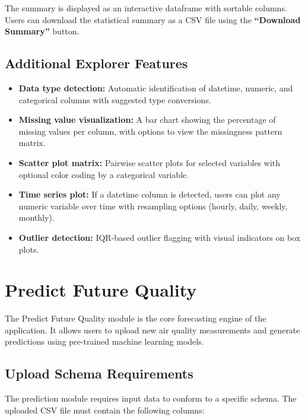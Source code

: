 \noindent The summary is displayed as an interactive dataframe with sortable columns. Users can download the statistical summary as a CSV file using the \textbf{``Download Summary''} button.

\subsection{Additional Explorer Features}

\begin{itemize}
    \item \textbf{Data type detection:} Automatic identification of datetime, numeric, and categorical columns with suggested type conversions.
    \item \textbf{Missing value visualization:} A bar chart showing the percentage of missing values per column, with options to view the missingness pattern matrix.
    \item \textbf{Scatter plot matrix:} Pairwise scatter plots for selected variables with optional color coding by a categorical variable.
    \item \textbf{Time series plot:} If a datetime column is detected, users can plot any numeric variable over time with resampling options (hourly, daily, weekly, monthly).
    \item \textbf{Outlier detection:} IQR-based outlier flagging with visual indicators on box plots.
\end{itemize}


\section{Predict Future Quality}
\label{sec:user-predict}

The Predict Future Quality module is the core forecasting engine of the application. It allows users to upload new air quality measurements and generate predictions using pre-trained machine learning models.

\subsection{Upload Schema Requirements}

The prediction module requires input data to conform to a specific schema. The uploaded CSV file must contain the following columns:

